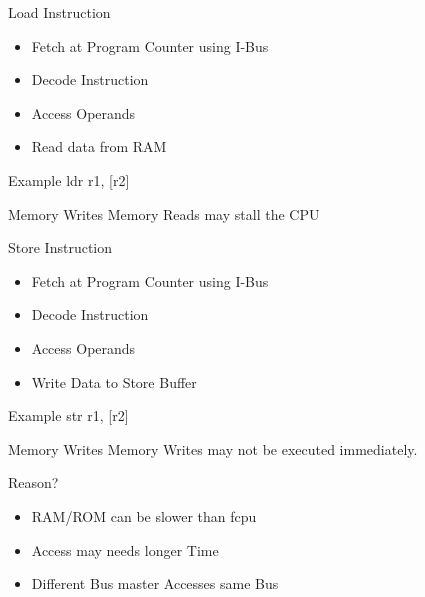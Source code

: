 \documentclass[10pt]{beamer}
\begin{document}
\begin{frame}[fragile]{Load Instruction}
\begin{itemize}
  \item Fetch at Program Counter using I-Bus
  \item Decode Instruction
  \item Access Operands
  \item Read data from RAM
\end{itemize}

\begin{block}{Example}
  ldr r1, [r2]
\end{block}

\begin{alertblock}{Memory Writes}
  Memory Reads may stall the CPU
\end{alertblock}

\end{frame}


\begin{frame}[fragile]{Store Instruction}
\begin{itemize}
  \item Fetch at Program Counter using I-Bus
  \item Decode Instruction
  \item Access Operands
  \item Write Data to Store Buffer
\end{itemize}

\begin{block}{Example}
  str r1, [r2]
\end{block}

\begin{alertblock}{Memory Writes}
  Memory Writes may not be executed immediately.
\end{alertblock}

\end{frame}

\begin{frame}[fragile]{Reason?}
\begin{itemize}
  \item RAM/ROM can be slower than fcpu
  \item Access may needs longer Time
  \item Different Bus master Accesses same Bus
\end{itemize}
\end{frame}
\end{document}
